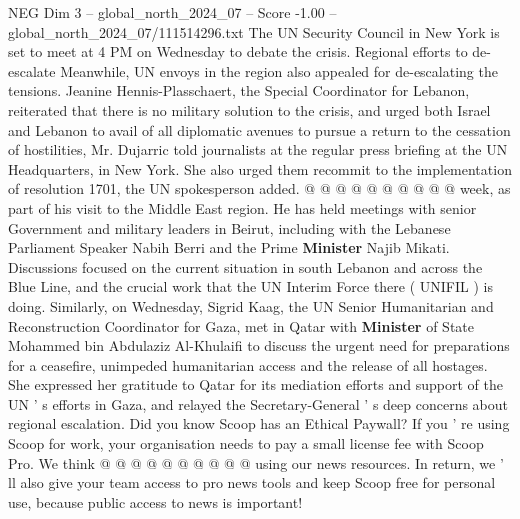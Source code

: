 \begin{textsample}{NEG Dim 3 – global\_north\_2024\_07 – Score -1.00 – global\_north\_2024\_07/111514296.txt}
The UN Security Council in New York is set to meet at 4 PM on Wednesday to debate the crisis.
Regional efforts to de-escalate Meanwhile, UN envoys in the region also appealed for de-escalating the tensions.
Jeanine Hennis-Plasschaert, the Special Coordinator for Lebanon, reiterated that there is no military solution to the crisis, and urged both Israel and Lebanon to avail of all diplomatic avenues to pursue a return to the cessation of hostilities, Mr.
Dujarric told journalists at the regular press briefing at the UN Headquarters, in New York.
She also urged them recommit to the implementation of resolution 1701, the UN spokesperson added. @ @ @ @ @ @ @ @ @ @ week, as part of his visit to the Middle East region.
He has held meetings with senior Government and military leaders in Beirut, including with the Lebanese Parliament Speaker Nabih Berri and the Prime \textbf{Minister} Najib Mikati.
Discussions focused on the current situation in south Lebanon and across the Blue Line, and the crucial work that the UN Interim Force there ( UNIFIL ) is doing.
Similarly, on Wednesday, Sigrid Kaag, the UN Senior Humanitarian and Reconstruction Coordinator for Gaza, met in Qatar with \textbf{Minister} of State Mohammed bin Abdulaziz Al-Khulaifi to discuss the urgent need for preparations for a ceasefire, unimpeded humanitarian access and the release of all hostages.
She expressed her gratitude to Qatar for its mediation efforts and support of the UN ' s efforts in Gaza, and relayed the Secretary-General ' s deep concerns about regional escalation.
Did you know Scoop has an Ethical Paywall?
If you ' re using Scoop for work, your organisation needs to pay a small license fee with Scoop Pro.
We think @ @ @ @ @ @ @ @ @ @ using our news resources.
In return, we ' ll also give your team access to pro news tools and keep Scoop free for personal use, because public access to news is important!

\end{textsample}
